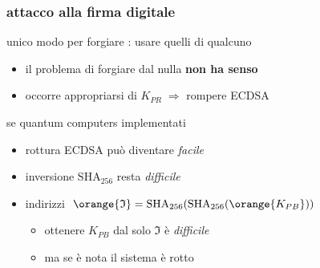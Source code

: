 \begin{frame}
	\frametitle{attacco alla firma digitale}
	
	unico modo per forgiare \bitcoinA: usare quelli di qualcuno
	\begin{itemize}
	  \item il problema di forgiare dal nulla \textbf{non ha senso}
	  \item  occorre appropriarsi di $K_{PR}\;\Rightarrow$ rompere ECDSA %
	\end{itemize}
	se {\color{blue}quantum computers} implementati 
	  \begin{itemize}
	    \item rottura ECDSA può diventare \textit{facile}
	    \item inversione $\mathrm{SHA}_{256}$ resta \textit{difficile}
	  	\item indirizzi $\;\orange{\mathfrak{I}} = \mathrm{SHA}_{256}(\mathrm{SHA}_{256}(\orange{K_{PB}}))$
		\begin{itemize}
		    \item ottenere $K_{PB}$ dal solo $\mathfrak{I}$ è \textit{difficile}
		    \item ma se è nota il sistema è rotto %
		\end{itemize}
	  \end{itemize}
\end{frame}